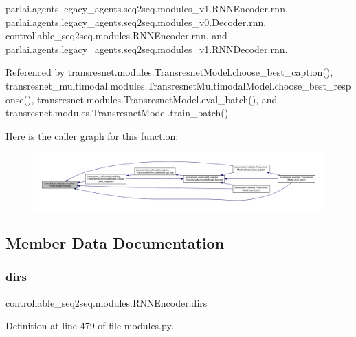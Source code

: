 parlai.\+agents.\+legacy\+\_\+agents.\+seq2seq.\+modules\+\_\+v1.\+R\+N\+N\+Encoder.\+rnn, parlai.\+agents.\+legacy\+\_\+agents.\+seq2seq.\+modules\+\_\+v0.\+Decoder.\+rnn, controllable\+\_\+seq2seq.\+modules.\+R\+N\+N\+Encoder.\+rnn, and parlai.\+agents.\+legacy\+\_\+agents.\+seq2seq.\+modules\+\_\+v1.\+R\+N\+N\+Decoder.\+rnn.



Referenced by transresnet.\+modules.\+Transresnet\+Model.\+choose\+\_\+best\+\_\+caption(), transresnet\+\_\+multimodal.\+modules.\+Transresnet\+Multimodal\+Model.\+choose\+\_\+best\+\_\+response(), transresnet.\+modules.\+Transresnet\+Model.\+eval\+\_\+batch(), and transresnet.\+modules.\+Transresnet\+Model.\+train\+\_\+batch().

Here is the caller graph for this function\+:
\nopagebreak
\begin{figure}[H]
\begin{center}
\leavevmode
\includegraphics[width=350pt]{classcontrollable__seq2seq_1_1modules_1_1RNNEncoder_a4f74c2dfb1db01950eea3907de66ab5d_icgraph}
\end{center}
\end{figure}


\subsection{Member Data Documentation}
\mbox{\label{classcontrollable__seq2seq_1_1modules_1_1RNNEncoder_a9c2de17fa143fbfb10900ef0ed05cec2}} 
\subsubsection{\texorpdfstring{dirs}{dirs}}
{\footnotesize\ttfamily controllable\+\_\+seq2seq.\+modules.\+R\+N\+N\+Encoder.\+dirs}



Definition at line 479 of file modules.\+py.



